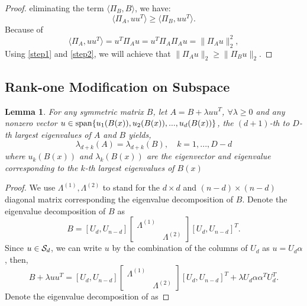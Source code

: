 \documentclass[aos,preprint]{imsart}
\newtheorem{lemma}[theorem]{Lemma}
\theoremstyle{remark}
\begin{document}
\begin{appendix}
\begin{proof}
eliminating the term $\langle \Pi_B, B\rangle$, we have:
\begin{equation}\label{step1}
\langle  \Pi_A , uu^T\rangle \geq  \langle  \Pi_B,  uu^T\rangle.
\end{equation}
Because of
\begin{equation}\label{step2}
\langle \Pi_A, uu^T \rangle= u^T \Pi_A u = u^T \Pi_A \Pi_A u = \|\Pi_A u\|_2^2,
\end{equation}
Using \eqref{step1} and \eqref{step2}, we will achieve that $\|\Pi_A u\|_2\geq \|\Pi_B u\|_2$.
\end{proof}
\subsection{Rank-one Modification on Subspace}
\begin{lemma}\label{eigvenvalue}
For any symmetric matrix $B$, let $A = B+\lambda u u^T$,  $\forall \lambda \geq 0$ and any nonzero vector $u\in  {\rm span}\{ u_1(B(x)), u_2(B(x)),..., u_d(B(x))\}$, the $(d+1)$-th  to $D$-th largest eigenvalues of $A$ and $B$ yields, 
\[
\lambda_{d+k}(A) = \lambda_{d+k}(B),\quad k=1,...,D-d
\]
where $u_k(B(x))$ and $\lambda_k(B(x))$ are the eigenvector and eigenvalue corresponding to the $k$-th largest eigenvalues of $B(x)$\end{lemma}
\begin{proof}
We use $\Lambda^{(1)}, \Lambda^{(2)}$ to stand for the $d\times d$ and $(n-d)\times(n-d)$ diagonal matrix corresponding the eigenvalue decomposition of $B$. Denote the eigenvalue decomposition of $B$ as
\[
B = [U_d, U_{n-d}] 
\left[
\begin{array}{cc}
\Lambda^{(1)} &\\
 &\Lambda^{(2)}
\end{array}
\right]
[U_d, U_{n-d}]^T.
\]
Since $u\in {\cal S}_d$, we can write $u$ by the combination of the columns of $U_d$ as $u = U_d\alpha$, then,
\[
B+\lambda u u^T = [U_d, U_{n-d}] 
\left[
\begin{array}{cc}
\Lambda^{(1)} &\\
  &\Lambda^{(2)}
\end{array}
\right]
[U_d, U_{n-d}]^T+ \lambda U_d \alpha \alpha^T U_d^T.
\]
Denote the eigenvalue decomposition of as

\end{proof}
\end{appendix}
\end{document}
